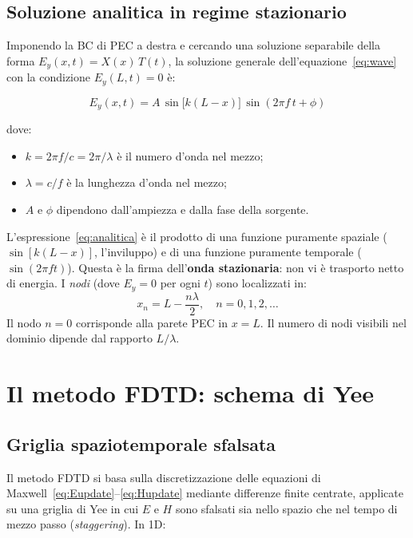 \documentclass[a4paper, 11pt]{article}
\newcommand{\Efield}{E_y}
\begin{document}
\subsection{Soluzione analitica in regime stazionario}
\label{sec:analitica}

Imponendo la BC di PEC a destra e cercando una soluzione separabile della
forma $\Efield(x,t) = X(x)\,T(t)$, la soluzione generale dell'equazione~\eqref{eq:wave}
con la condizione $\Efield(L,t)=0$ è:

\begin{equation}
    \Efield(x,t) = A\,\sin\!\bigl[k(L-x)\bigr]\,\sin(2\pi f\, t + \phi)
    \label{eq:analitica}
\end{equation}

dove:
\begin{itemize}
    \item $k = 2\pi f / c = 2\pi/\lambda$ è il numero d'onda nel mezzo;
    \item $\lambda = c/f$ è la lunghezza d'onda nel mezzo;
    \item $A$ e $\phi$ dipendono dall'ampiezza e dalla fase della sorgente.
\end{itemize}

\begin{nota}
L'espressione~\eqref{eq:analitica} è il prodotto di una funzione puramente
spaziale ($\sin[k(L-x)]$, l'inviluppo) e di una funzione puramente temporale
($\sin(2\pi f t)$). Questa è la firma dell'\textbf{onda stazionaria}: non
vi è trasporto netto di energia. I \emph{nodi} (dove $\Efield=0$ per ogni $t$)
sono localizzati in:
\[
    x_n = L - \frac{n\lambda}{2}, \quad n = 0, 1, 2, \ldots
\]
Il nodo $n=0$ corrisponde alla parete PEC in $x=L$. Il numero di nodi
visibili nel dominio dipende dal rapporto $L/\lambda$.
\end{nota}

\section{Il metodo FDTD: schema di Yee}

\subsection{Griglia spaziotemporale sfalsata}

Il metodo FDTD si basa sulla discretizzazione delle equazioni di Maxwell~\eqref{eq:Eupdate}--\eqref{eq:Hupdate}
mediante differenze finite centrate, applicate su una griglia di Yee in cui
$E$ e $H$ sono sfalsati sia nello spazio che nel tempo di mezzo passo
(\emph{staggering}). In 1D:
\end{document}
